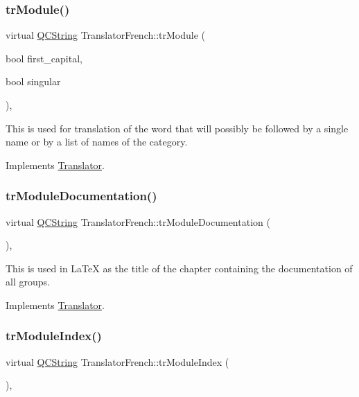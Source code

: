 \subsubsection{\texorpdfstring{trModule()}{trModule()}}
{\footnotesize\ttfamily virtual \mbox{\hyperlink{class_q_c_string}{Q\+C\+String}} Translator\+French\+::tr\+Module (\begin{DoxyParamCaption}\item[{bool}]{first\+\_\+capital,  }\item[{bool}]{singular }\end{DoxyParamCaption})\hspace{0.3cm}{\ttfamily [inline]}, {\ttfamily [virtual]}}

This is used for translation of the word that will possibly be followed by a single name or by a list of names of the category. 

Implements \mbox{\hyperlink{class_translator}{Translator}}.

\mbox{\label{class_translator_french_ae20a7f0dbe22322e39349b7db95958a1}} 
\subsubsection{\texorpdfstring{trModuleDocumentation()}{trModuleDocumentation()}}
{\footnotesize\ttfamily virtual \mbox{\hyperlink{class_q_c_string}{Q\+C\+String}} Translator\+French\+::tr\+Module\+Documentation (\begin{DoxyParamCaption}{ }\end{DoxyParamCaption})\hspace{0.3cm}{\ttfamily [inline]}, {\ttfamily [virtual]}}

This is used in La\+TeX as the title of the chapter containing the documentation of all groups. 

Implements \mbox{\hyperlink{class_translator}{Translator}}.

\mbox{\label{class_translator_french_ad0c617a48e315f8fc741458a573bf122}} 
\subsubsection{\texorpdfstring{trModuleIndex()}{trModuleIndex()}}
{\footnotesize\ttfamily virtual \mbox{\hyperlink{class_q_c_string}{Q\+C\+String}} Translator\+French\+::tr\+Module\+Index (\begin{DoxyParamCaption}{ }\end{DoxyParamCaption})\hspace{0.3cm}{\ttfamily [inline]}, {\ttfamily [virtual]}}

